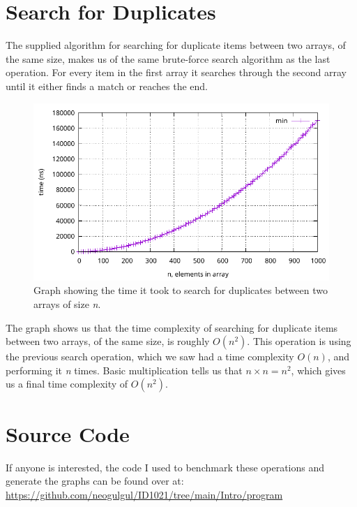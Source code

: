 \documentclass[a4paper, 11pt]{article}
\begin{document}
\section{Search for Duplicates}
	The supplied algorithm for searching for duplicate items between two arrays, of the same size, makes us of the same brute-force search algorithm as the last operation.
	For every item in the first array it searches through the second array until it either finds a match or reaches the end.
	\par
	\begin{figure}[h]
		\centering
		\includegraphics[scale=0.8]{graphs/plot4.pdf}
		\caption{
			Graph showing the time it took to search for duplicates between two arrays of size \textit{n}.
		}
	\end{figure}
	The graph shows us that the time complexity of searching for duplicate items between two arrays, of the same size, is roughly \(O(n^2)\).
	This operation is using the previous search operation, which we saw had a time complexity \(O(n)\), and performing it \textit{n} times.
	Basic multiplication tells us that \(n \times n = n^2\), which gives us a final time complexity of \(O(n^2)\).

\section{Source Code}
	If anyone is interested, the code I used to benchmark these operations and generate the graphs can be found over at: \url{https://github.com/neogulgul/ID1021/tree/main/Intro/program}
\end{document}

